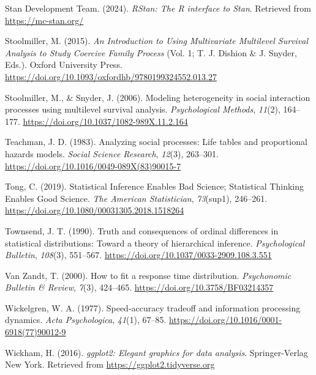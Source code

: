 \documentclass[
  man, donotrepeattitle,floatsintext]{apa6}
\newlength{\cslhangindent}
\newenvironment{CSLReferences}[2] %
 {\begin{list}{}{%
  \setlength{\itemindent}{0pt}
  \setlength{\leftmargin}{0pt}
  \setlength{\parsep}{0pt}
  \ifodd #1
   \setlength{\leftmargin}{\cslhangindent}
   \setlength{\itemindent}{-1\cslhangindent}
  \fi
  \setlength{\itemsep}{#2\baselineskip}}}
 {\end{list}}
\begin{document}
\begin{CSLReferences}{1}{0}
Stan Development Team. (2024). \emph{{RStan}: The {R} interface to {Stan}}. Retrieved from \url{https://mc-stan.org/}

Stoolmiller, M. (2015). \emph{An {Introduction} to {Using Multivariate Multilevel Survival Analysis} to {Study Coercive Family Process}} (Vol. 1; T. J. Dishion \& J. Snyder, Eds.). Oxford University Press. \url{https://doi.org/10.1093/oxfordhb/9780199324552.013.27}

Stoolmiller, M., \& Snyder, J. (2006). Modeling heterogeneity in social interaction processes using multilevel survival analysis. \emph{Psychological Methods}, \emph{11}(2), 164--177. \url{https://doi.org/10.1037/1082-989X.11.2.164}

Teachman, J. D. (1983). Analyzing social processes: {Life} tables and proportional hazards models. \emph{Social Science Research}, \emph{12}(3), 263--301. \url{https://doi.org/10.1016/0049-089X(83)90015-7}

Tong, C. (2019). Statistical {Inference Enables Bad Science}; {Statistical Thinking Enables Good Science}. \emph{The American Statistician}, \emph{73}(sup1), 246--261. \url{https://doi.org/10.1080/00031305.2018.1518264}

Townsend, J. T. (1990). Truth and consequences of ordinal differences in statistical distributions: {Toward} a theory of hierarchical inference. \emph{Psychological Bulletin}, \emph{108}(3), 551--567. \url{https://doi.org/10.1037/0033-2909.108.3.551}

Van Zandt, T. (2000). How to fit a response time distribution. \emph{Psychonomic Bulletin \& Review}, \emph{7}(3), 424--465. \url{https://doi.org/10.3758/BF03214357}

Wickelgren, W. A. (1977). Speed-accuracy tradeoff and information processing dynamics. \emph{Acta Psychologica}, \emph{41}(1), 67--85. \url{https://doi.org/10.1016/0001-6918(77)90012-9}

Wickham, H. (2016). \emph{ggplot2: Elegant graphics for data analysis}. Springer-Verlag New York. Retrieved from \url{https://ggplot2.tidyverse.org}


\end{CSLReferences}
\end{document}
